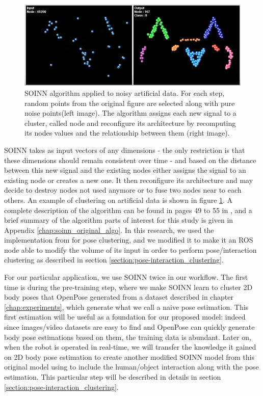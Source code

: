 \begin{figure}[h]
    \centering
    \includegraphics[width=150mm, keepaspectratio]{images/SOINN_cat.png}
    \caption[SOINN algorithm applied to noisy artificial data]{SOINN algorithm applied to noisy artificial data. For each step, random points from the original figure are selected along with pure noise points(left image). The algorithm assigns each new signal to a cluster, called node and reconfigure its architecture by recomputing its nodes values and the relationship between them (right image).}
    \label{fig:SOINN_cat}
\end{figure}

SOINN takes as input vectors of any dimensions - the only restriction is that these dimensions should remain consistent over time - and based on the distance between this new signal and the existing nodes either assigns the signal to an existing node or creates a new one. It then reconfigure its architecture and may decide to destroy nodes not used anymore or to fuse two nodes near to each others.
An example of clustering on artificial data is shown in figure \ref{fig:SOINN_cat}. A complete description of the algorithm can be found in pages 49 to 55 in \cite{SOINN}, and a brief summary of the algorithm parts of interest for this study is given in Appendix \ref{chap:soinn_original_algo}. In this research, we used the implementation from \cite{soinn_implementation} for pose clustering, and we modified it to make it an ROS node able to modify the volume of its input in order to perform pose/interaction clustering as described in section \ref{section:pose-interaction_clustering}.

For our particular application, we use SOINN twice in our workflow. The first time is during the pre-training step, where we make SOINN learn to cluster 2D body poses that OpenPose generated from a dataset described in chapter \ref{chap:experiments}, which generate what we call a naive pose estimation. This first estimation will be useful as a foundation for our proposed model: indeed since images/video datasets are easy to find and OpenPose can quickly generate body pose estimations based on them, the training data is abundant. Later on, when the robot is operated in real-time, we will transfer the knowledge it gained on 2D body pose estimation to create another modified SOINN model from this original model using to include the human/object interaction along with the pose estimation. This particular step will be described in details in section \ref{section:pose-interaction_clustering}.

